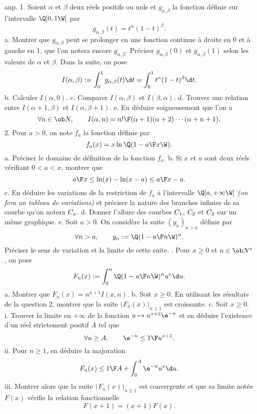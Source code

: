 \exo [Level=1,Fight=2,Learn=2,Type=\Problèmes,Field=\Intégration,Origin=Maroc06] anp. 
1. Soient $\alpha$ et $\beta$ deux réels positifs ou nuls et $g_{\alpha,\beta}$ la fonction définie sur l'intervalle $\Q]0,1\W[$ par 
$$
g_{\alpha,\beta}(t)=t^\alpha(1-t)^\beta.
$$
a. Montrer que $g_{\alpha,\beta}$ peut se prolonger en une fonction continue à droite en $0$ et à gauche en $1$, que l'on notera encore $g_{\alpha, \beta}$. Préciser $g_{\alpha,\beta}(0)$ et $g_{\alpha,\beta}(1)$ selon les valeurs de $\alpha$ et $\beta$. 
\medskip\noindent
Dans la suite, on pose
$$
I(\alpha,\beta):=\int_0^1g_{\alpha,\beta}(t)\d t=\int_0^1t^\alpha(1-t)^\beta\d t. 
$$
b. Calculer $I(\alpha,0)$. \pn
c. Comparer $I(\alpha,\beta)$ et $I(\beta,\alpha)$. \medskip\noindent
d. Trouver une relation entre $I(\alpha+1,\beta)$ et $I(\alpha,\beta+1)$. \medskip\noindent
e. En déduire soigneusement que l'on a 
$$
\forall n\in\ob N, \qquad I(\alpha,n)={n!\F (\alpha+1)(\alpha+2)\cdots(\alpha+n+1)}.
$$
2. Pour $a>0$, on note $f_a$ la fonction définie par 
$$
f_a(x)=x\ln\Q(1-{a\F x}\W).
$$
a. Préciser le domaine de définition de la fonction $f_a$. 
\medskip\noindent
b. Si $x$ et $a$ sont deux réels vérifiant $0<a<x$, montrer que 
$$
{a\F x}\le\ln(x)-\ln(x-a)\le{a\F x-a}.
$$
c. En déduire les variations de la restriction de $f_a$ à l'intervalle $\Q]a,+\infty\W[$ {\it (on fera un tableau de variations)}
et préciser la nature des branches infinies de sa courbe qu'on notera $\sc C_a$. 
\medskip
\noindent
d. Donner l'allure des courbes $\sc C_1$, $\sc C_2$ et $\sc C_3$ sur un même graphique. 
\medskip\noindent
e. Soit $a>0$. On considère la suite $(y_n)_{n>a}$ définie par  
$$
\forall n>a, \qquad y_n:=\Q(1-{a\F n}\W)^n. 
$$
Préciser le sens de variation et la limite de cette suite. 
\medskip{}. Pour $x\ge0$ et $n\in\ob N^*$, on pose 
$$
 F_n(x):=\int_0^n\Q(1-{u\F n}\W)^nu^x\d u.
$$
a. Montrer que $F_n(x)=n^{x+1}I(x,n)$. \medskip\noindent
b. Soit $x\ge0$. En utilisant les résultats de la question 2, montrer que la suite $\big(F_n(x)\big)_{n\ge1}$ est croissante. 
\medskip\noindent
c. Soit $x\ge0$. \pn
i. Trouver la limite en $+\infty$ de la fonction $u\mapsto u^{x+2}\e^{-u}$ et en déduire l'existence d'un réel strictement positif $A$ tel que 
$$
\forall u\ge A, \qquad \e^{-u}\le {1\F u^{x+2}}.
$$
ii. Pour $n\ge1$, en déduire la majoration
$$
F_n(x)\le{1\F A}+\int_0^A\e^{-u}u^x\d u. 
$$
iii. Montrer alors que la suite $\big(F_n(x)\big)_{n\ge1}$ est convergente et que sa limite notée $F(x)$ vérifie la relation fonctionnelle
$$
F(x+1)=(x+1)F(x). 
$$

